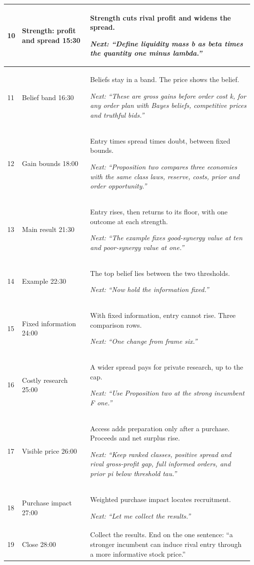 \documentclass[10.5pt]{article}
\makeatletter
\newenvironment{cards}{\begin{longtable}{@{}IQA@{}}}{\end{longtable}}
\newcommand{\card}[3]{#1 & #2 & #3\\\midrule}
\makeatother
\begin{document}
\begin{cards}
\card{10}{Strength: profit and spread \hfill 15:30}{Strength cuts rival profit and widens the spread.\par\textit{Next: ``Define liquidity mass b as beta times the quantity one minus lambda.''}}
\card{11}{Belief band \hfill 16:30}{Beliefs stay in a band. The price shows the belief.\par\textit{Next: ``These are gross gains before order cost k, for any order plan with Bayes beliefs, competitive prices and truthful bids.''}}
\card{12}{Gain bounds \hfill 18:00}{Entry times spread times doubt, between fixed bounds.\par\textit{Next: ``Proposition two compares three economies with the same class laws, reserve, costs, prior and order opportunity.''}}
\card{13}{Main result \hfill 21:30}{Entry rises, then returns to its floor, with one outcome at each strength.\par\textit{Next: ``The example fixes good-synergy value at ten and poor-synergy value at one.''}}
\card{14}{Example \hfill 22:30}{The top belief lies between the two thresholds.\par\textit{Next: ``Now hold the information fixed.''}}
\card{15}{Fixed information \hfill 24:00}{With fixed information, entry cannot rise. Three comparison rows.\par\textit{Next: ``One change from frame six.''}}
\card{16}{Costly research \hfill 25:00}{A wider spread pays for private research, up to the cap.\par\textit{Next: ``Use Proposition two at the strong incumbent F one.''}}
\card{17}{Visible price \hfill 26:00}{Access adds preparation only after a purchase. Proceeds and net surplus rise.\par\textit{Next: ``Keep ranked classes, positive spread and rival gross-profit gap, full informed orders, and prior pi below threshold tau.''}}
\card{18}{Purchase impact \hfill 27:00}{Weighted purchase impact locates recruitment.\par\textit{Next: ``Let me collect the results.''}}
\card{19}{Close \hfill 28:00}{Collect the results. End on the one sentence: ``a stronger incumbent can induce rival entry through a more informative stock price.''}
\end{cards}
\end{document}
